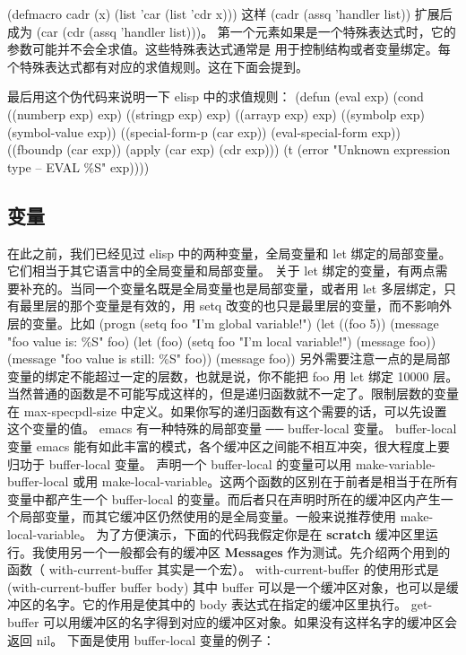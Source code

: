\documentclass[11pt]{ctexart}
\begin{document}
(defmacro cadr (x)
(list 'car (list 'cdr x)))
这样 (cadr (assq 'handler list)) 扩展后成为 (car (cdr (assq 'handler list)))。
第一个元素如果是一个特殊表达式时，它的参数可能并不会全求值。这些特殊表达式通常是
用于控制结构或者变量绑定。每个特殊表达式都有对应的求值规则。这在下面会提到。

最后用这个伪代码来说明一下 elisp 中的求值规则：
(defun (eval exp)
(cond
((numberp exp) exp)
((stringp exp) exp)
((arrayp exp) exp)
((symbolp exp) (symbol-value exp))
((special-form-p (car exp))
(eval-special-form exp))
((fboundp (car exp))
(apply (car exp) (cdr exp)))
(t
(error "Unknown expression type -- EVAL \%S" exp))))
\subsection{变量}
\label{sec:orgbc0c2d0}
\begin{SCR}
在此之前，我们已经见过 elisp 中的两种变量，全局变量和 let 绑定的局部变量。它们相当于其它语言中的全局变量和局部变量。
关于 let 绑定的变量，有两点需要补充的。当同一个变量名既是全局变量也是局部变量，或者用 let 多层绑定，只有最里层的那个变量是有效的，用 setq 改变的也只是最里层的变量，而不影响外层的变量。比如
(progn
(setq foo "I'm global variable!")
(let ((foo 5))
(message "foo value is: \%S" foo)
(let (foo)
(setq foo "I'm local variable!")
(message foo))
(message "foo value is still: \%S" foo))
(message foo))
另外需要注意一点的是局部变量的绑定不能超过一定的层数，也就是说，你不能把 foo 用 let 绑定 10000 层。当然普通的函数是不可能写成这样的，但是递归函数就不一定了。限制层数的变量在 max-specpdl-size 中定义。如果你写的递归函数有这个需要的话，可以先设置这个变量的值。
emacs 有一种特殊的局部变量 ── buffer-local 变量。
buffer-local 变量
emacs 能有如此丰富的模式，各个缓冲区之间能不相互冲突，很大程度上要归功于 buffer-local 变量。
声明一个 buffer-local 的变量可以用 make-variable-buffer-local 或用 make-local-variable。这两个函数的区别在于前者是相当于在所有变量中都产生一个 buffer-local 的变量。而后者只在声明时所在的缓冲区内产生一个局部变量，而其它缓冲区仍然使用的是全局变量。一般来说推荐使用 make-local-variable。
为了方便演示，下面的代码我假定你是在 \textbf{scratch} 缓冲区里运行。我使用另一个一般都会有的缓冲区 \textbf{Messages} 作为测试。先介绍两个用到的函数（ with-current-buffer 其实是一个宏）。
with-current-buffer 的使用形式是
(with-current-buffer buffer
body)
其中 buffer 可以是一个缓冲区对象，也可以是缓冲区的名字。它的作用是使其中的 body 表达式在指定的缓冲区里执行。
get-buffer 可以用缓冲区的名字得到对应的缓冲区对象。如果没有这样名字的缓冲区会返回 nil。
下面是使用 buffer-local 变量的例子：

\end{SCR}
\end{document}
